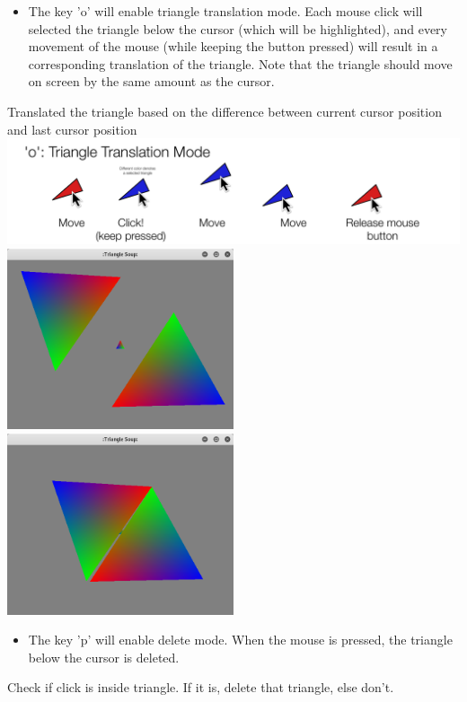 \documentclass[11pt]{article}
\begin{document}
\newpage

\begin{itemize}
	\item The key 'o' will enable triangle translation mode. Each mouse click will selected the triangle below the cursor (which will be highlighted), and every movement of the mouse (while keeping the button pressed) will result in a corresponding translation of the triangle. Note that the triangle should move on screen by the same amount as the cursor.
\end{itemize}

Translated the triangle based on the difference between current cursor position and last cursor position
\includegraphics[width=1\textwidth]{o.pdf}
\includegraphics[width=0.5\textwidth]{translate.png}
\includegraphics[width=0.5\textwidth]{translate1.png}
\newpage
\begin{itemize}
	\item The key 'p' will enable delete mode. When the mouse is pressed, the triangle below the cursor is deleted.
\end{itemize}
Check if click is inside triangle. If it is, delete that triangle, else don't.
\end{document}
